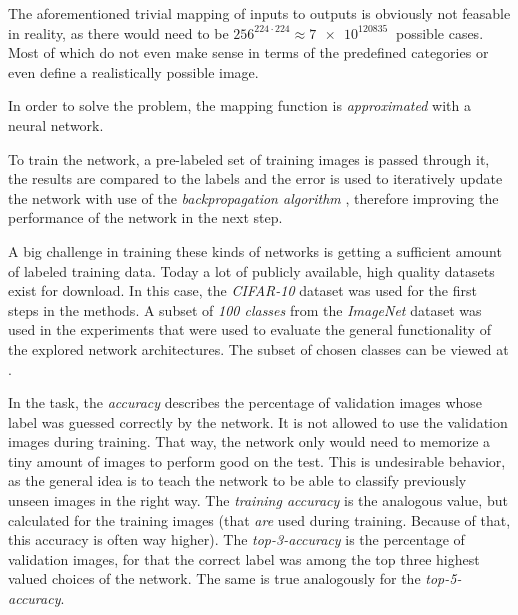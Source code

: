 The aforementioned trivial mapping of inputs to outputs is obviously not feasable in reality, as there would need to be $256^{224\cdot 224} \approx \SI[]{7e120835}[]{}$ possible cases. Most of which do not even make sense in terms of the predefined categories or even define a realistically possible image.

In order to solve the problem, the mapping function is \emph{approximated} with a neural network. 

To train the network, a pre-labeled set of training images is passed through it, the results are compared to the labels and the error is used to iteratively update the network with use of the \emph{backpropagation algorithm} \cite{machineLearningMitchell}, therefore improving the performance of the network in the next step.

A big challenge in training these kinds of networks is getting a sufficient amount of labeled training data. 
Today a lot of publicly available, high quality datasets exist for download. 
In this case, the \emph{CIFAR-10} \cite{cifarDataset} dataset was used for the first steps in the methods. 
A subset of \emph{100 classes} from the \emph{ImageNet} \cite{imagenetDataset} dataset was used in the experiments that were used to evaluate the general functionality of the explored network architectures.
The subset of chosen classes can be viewed at \cite{selfComputerScience} .

In the task, the \emph{accuracy} describes the percentage of validation images whose label was guessed correctly by the network. It is not allowed to use the validation images during training. That way, the network only would need to memorize a tiny amount of images to perform good on the test. This is undesirable behavior, as the general idea is to teach the network to be able to classify previously unseen images in the right way. The \emph{training accuracy} is the analogous value, but calculated for the training images (that \emph{are} used during training. Because of that, this accuracy is often way higher).
The \emph{top-3-accuracy} is the percentage of validation images, for that the correct label was among the top three highest valued choices of the network. The same is true analogously for the \emph{top-5-accuracy}.